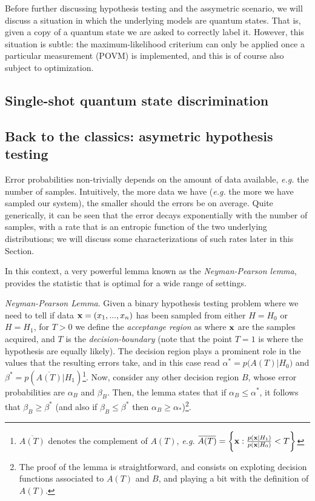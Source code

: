 Before further discussing hypothesis testing and the assymetric scenario, we will discuss a situation in which the underlying models are quantum states. That is, given a copy of a quantum state we are asked to correctly label it. However, this situation is subtle: the maximum-likelihood criterium can only be applied once a particular measurement (POVM) is implemented, and this is of course also subject to optimization.
\subsection{Single-shot quantum state discrimination}\label{ssec:1_qdisc}


\subsection{Back to the classics: asymetric hypothesis testing}\label{ssec:asym}
Error probabilities non-trivially depends on the amount of data available, \textit{e.g.} the number of samples. Intuitively, the more data we have (\textit{e.g.} the more we have sampled our system), the smaller should the errors be on average. Quite generically, it can be seen that the error decays exponentially with the number of samples, with a rate that is an entropic function of the two underlying distributions; we will discuss some characterizations of such rates later in this Section.
%

In this context, a very powerful lemma known as the \textit{Neyman-Pearson lemma}, provides the statistic that is optimal for a wide range of settings.

\textit{Neyman-Pearson Lemma}. Given a binary hypothesis testing problem where we need to tell if data $\mathbf{x} = (x_1,...,x_n)$ has been sampled from either $H=H_0$ or $H=H_1$, for $T>0$ we define the \textit{acceptange region} as
where $\mathbf{x}$ are the samples acquired, and $T$ is the \textit{decision-boundary} (note that the point $T=1$ is where the hypothesis are equally likely). The decision region plays a prominent role in the values that the resulting errors take, and in this case read $\alpha^* = p \big(A(T)|H_0\big)$ and $\beta^* = p(\overbar{A(T)}|H_1)$\footnote{$\overbar{A(T)}$ denotes the complement of $A(T)$, \textit{e.g.} $\overbar{A(T)} = \Llaves{\xf: \frac{p(\xf|H_1)}{p(\xf|H_0)} <T}$}. Now, consider any other decision region $B$, whose error probabilities are $\alpha_B$ and $\beta_B$.
Then, the lemma states that if $\alpha_B \leq \alpha^*$, it follows that
$\beta_B \geq \beta^*$ (and also if $\beta_B \leq \beta^*$ then $\alpha_B \geq \alpha_*$)\footnote{The proof of the lemma is straightforward, and consists on exploting decision functions associated to $A(T)$ and $B$, and playing a bit with the definition of $A(T)$.}.

